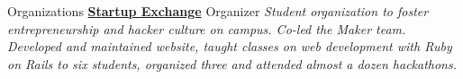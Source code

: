 \documentclass[a4paper,12pt]{article}
\begin{document}
\begin{resumeblock}{Organizations}
{{\footnotesize \textbf{ \href{http://startupexchange.gatech.edu/}{Startup Exchange} }}}\newline
\footnotesize{Organizer \hspace{.1in}%
\textit{
    Student organization to foster entrepreneurship and hacker culture on campus. Co-led the Maker team.
    Developed and maintained website, taught classes on web development with Ruby on Rails to six students,
    organized three and attended almost a dozen hackathons.
}}
\end{resumeblock}

\end{document}
